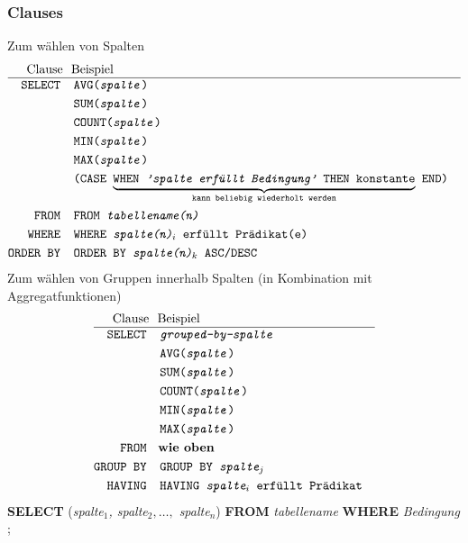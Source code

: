 \documentclass{article}
\begin{document}
			\subsubsection*{Clauses}
				Zum w\"ahlen von Spalten
				\begin{align*}
					\text{Clause } & \text{ Beispiel} & \\
					\hline
					\texttt{SELECT } & \texttt{ AVG(\textit{spalte})}\\
					& \texttt{ SUM(\textit{spalte})}\\
					& \texttt{ COUNT(\textit{spalte})}\\
					& \texttt{ MIN(\textit{spalte})}\\
					& \texttt{ MAX(\textit{spalte})}\\
					& \texttt{ (CASE $\underbrace{\text{WHEN } \textit{'spalte erf\"ullt Bedingung'}\text{ THEN konstante}}_{\text{kann beliebig wiederholt werden}}$ END)}\\
					\texttt{FROM } & \texttt{ FROM \textit{tabellename(n)}}\\
					\texttt{WHERE } & \texttt{ WHERE \textit{spalte(n)$_i$} erf\"ullt Pr\"adikat(e)}\\
					\texttt{ORDER BY } & \texttt{ ORDER BY \textit{spalte(n)$_k$} ASC/DESC}\\
				\end{align*}
				Zum w\"ahlen von Gruppen innerhalb Spalten (in Kombination mit Aggregatfunktionen)
				\begin{align*}
					\text{Clause } & \text{ Beispiel} & \\
					\hline
					\texttt{SELECT } & \texttt{\textit{ grouped-by-spalte}}\\
					& \texttt{ AVG(\textit{spalte})}\\
					& \texttt{ SUM(\textit{spalte})}\\
					& \texttt{ COUNT(\textit{spalte})}\\
					& \texttt{ MIN(\textit{spalte})}\\
					& \texttt{ MAX(\textit{spalte})}\\
					\texttt{FROM } & \textbf{ wie oben}\\
					\texttt{GROUP BY } & \texttt{ GROUP BY \textit{spalte$_j$}}\\
					\texttt{HAVING } & \texttt{ HAVING \textit{spalte$_i$} erf\"ullt Pr\"adikat}\\
				\end{align*}
			\textbf{SELECT } (\textit{spalte$_1$, spalte$_2, \ldots,$ spalte$_n$}) \textbf{ FROM } \textit{tabellename} \textbf{ WHERE } \textit{ Bedingung };\\
\end{document}
